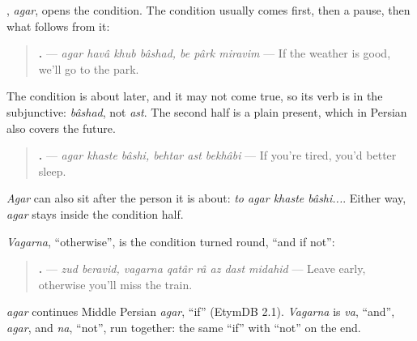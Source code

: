 \begin{grammarlens}[title={Grammar Lens: the condition first, in the subjunctive}]
\textbf{}, \emph{agar}, opens the condition. The condition usually comes first, then a pause, then what follows from it:

\begin{quote}
\textbf{      .} — \emph{agar havâ khub bâshad, be pârk miravim} — If the weather is good, we'll go to the park.
\end{quote}

The condition is about later, and it may not come true, so its verb is in the subjunctive: \emph{bâshad}, not \emph{ast}. The second half is a plain present, which in Persian also covers the future.

\begin{quote}
\textbf{     .} — \emph{agar khaste bâshi, behtar ast bekhâbi} — If you're tired, you'd better sleep.
\end{quote}

\emph{Agar} can also sit after the person it is about: \emph{to agar khaste bâshi...}. Either way, \emph{agar} stays inside the condition half.
\end{grammarlens}

\begin{grammarlens}[title={Grammar Lens: vagarna, the other branch}]
\emph{Vagarna}, \textquotedblleft{}otherwise\textquotedblright{}, is the condition turned round, \textquotedblleft{}and if not\textquotedblright{}:

\begin{quote}
\textbf{       .} — \emph{zud beravid, vagarna qatâr râ az dast midahid} — Leave early, otherwise you'll miss the train.
\end{quote}
\end{grammarlens}

\begin{cousinweb}
\emph{agar} continues Middle Persian \emph{agar}, \textquotedblleft{}if\textquotedblright{} (EtymDB 2.1). \emph{Vagarna} is \emph{va}, \textquotedblleft{}and\textquotedblright{}, \emph{agar}, and \emph{na}, \textquotedblleft{}not\textquotedblright{}, run together: the same \textquotedblleft{}if\textquotedblright{} with \textquotedblleft{}not\textquotedblright{} on the end.
\end{cousinweb}

